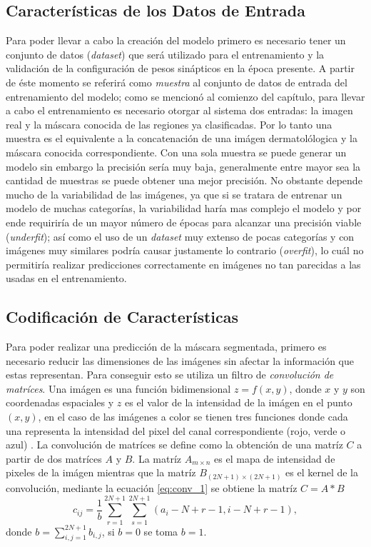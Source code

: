\subsection{Características de los Datos de Entrada}
Para poder llevar a cabo la creación del modelo primero es necesario tener un conjunto de datos (\emph{dataset}) que será utilizado para el entrenamiento y la validación de la configuración de pesos sinápticos en la época presente.
A partir de éste momento se referirá como \emph{muestra} al conjunto de datos de entrada del entrenamiento del modelo; como se mencionó al comienzo del capítulo, para llevar a cabo el entrenamiento es necesario otorgar al sistema dos entradas: la imagen real y la máscara conocida de las regiones ya clasificadas. Por lo tanto una muestra es el equivalente a la concatenación de una imágen dermatolólogica y la máscara conocida correspondiente. Con una sola muestra se puede generar un modelo sin embargo la precisión sería muy baja, generalmente entre mayor sea la cantidad de muestras se puede obtener una mejor precisión. No obstante depende mucho de la variabilidad de las imágenes, ya que si se tratara de entrenar un modelo de muchas categorías, la variabilidad haría mas complejo el modelo y por ende requiriría de un mayor número de épocas para alcanzar una precisión viable (\emph{underfit}); así como el uso de un \emph{dataset} muy extenso de pocas categorías y con imágenes muy similares podría causar justamente lo contrario (\emph{overfit}), lo cuál no permitiría realizar predicciones correctamente en imágenes no tan parecidas a las usadas en el entrenamiento.

\subsection{Codificación de Características}
Para poder realizar una predicción de la máscara segmentada, primero es necesario reducir las dimensiones de las imágenes sin afectar la información que estas representan. Para conseguir esto se utiliza un filtro de \emph{convolución de matríces}. Una imágen es una función bidimensional $ z = f(x,y)$, donde $x$ y $y$ son coordenadas espaciales y $z$ es el valor de la intensidad de la imágen en el punto $(x , y)$, en el caso de las imágenes a color se tienen tres funciones donde cada una representa la intensidad del pixel del canal correspondiente (rojo, verde o azul) \citep[~p. 100]{conv_1}. La convolución de matríces se define como la obtención de una matríz $C$ a partir de dos matríces $A$ y $B$. La matríz $A_{m \times n}$ es el mapa de intensidad de pixeles de la imágen mientras que la matríz $B_{(2N+1) \times (2N+1)}$ es el kernel de la convolución, mediante la ecuación \ref{eq:conv_1} se obtiene la matríz $C = A * B$
\begin{equation}
c_{ij} = \frac{1}{b} \sum_{r=1}^{2N+1}\sum_{s=1}^{2N+1}(a_i-N+r-1, i-N+r-1),
\label{eq:conv_1}
\end{equation}
donde $b = \sum_{i,j=1}^{2N+1} b_{i,j}$, si $b=0$ se toma $b=1$.

